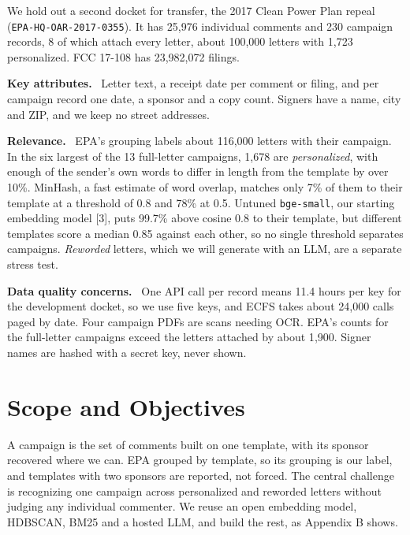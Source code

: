 \documentclass[10pt,twocolumn]{article}
\newcommand{\lead}[1]{\textbf{#1.}\ }
\begin{document}
\begin{leads}
        We hold out a second docket for transfer, the 2017 Clean Power Plan repeal
        (\texttt{EPA-HQ-OAR-2017-0355}). It has 25{,}976 individual comments and 230 campaign records,
        8 of which attach every letter, about 100{,}000 letters with 1{,}723 personalized. FCC 17-108 has 23{,}982{,}072 filings.
  \item \lead{Key attributes} Letter text, a receipt date per comment or filing, and per campaign
        record one date, a sponsor and a copy count. Signers have a name, city and ZIP, and we keep no
        street addresses.
  \item \lead{Relevance} EPA's grouping labels about 116{,}000 letters with their campaign. In the six largest of the 13 full-letter campaigns,
        1{,}678 are \emph{personalized}, with enough of the sender's own words to differ in length from
        the template by over 10\%. MinHash, a fast estimate of word overlap, matches only 7\% of them to their template at a
        threshold of 0.8 and 78\% at 0.5. Untuned \texttt{bge-small}, our starting embedding model [3], puts 99.7\% above cosine 0.8 to their
        template, but different templates score a median 0.85 against each other, so no single threshold separates campaigns. \emph{Reworded} letters, which we will generate with an LLM, are a
        separate stress test.
  \item \lead{Data quality concerns} One API call per record means 11.4 hours per key for the
        development docket, so we use five keys, and ECFS takes about 24{,}000 calls paged by date.
        Four campaign PDFs are scans needing OCR. EPA's counts for the full-letter campaigns exceed the letters
        attached by about 1{,}900. Signer names are hashed with a secret key, never shown.
\end{leads}

\section{Scope and Objectives}

A campaign is the set of comments built on one template, with its sponsor recovered where we
can. EPA grouped by template, so its grouping is our label, and templates with two sponsors are
reported, not forced. The central
challenge is recognizing one campaign across personalized and reworded letters without judging any
individual commenter. We reuse an open embedding model, HDBSCAN, BM25 and a hosted LLM, and build
the rest, as Appendix B shows.
\end{document}

